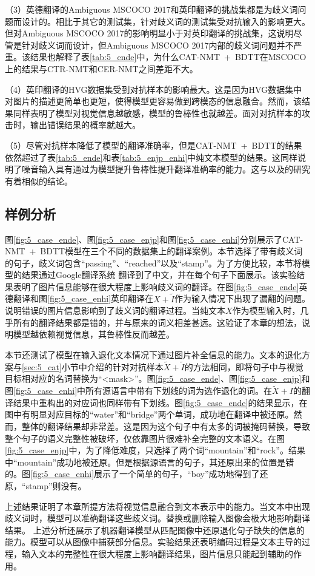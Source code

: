 （3）英德翻译的Ambiguous MSCOCO 2017和英印翻译的挑战集都是为歧义词问题而设计的。相比于其它的测试集，针对歧义词的测试集受对抗输入的影响更大。但对Ambiguous MSCOCO 2017的影响明显小于对英印翻译的挑战集，这说明尽管是针对歧义词而设计，但Ambiguous MSCOCO 2017内部的歧义词问题并不严重。该结果也解释了表\ref{tab:5_ende}中，为什么CAT-NMT~+~BDTT在MSCOCO上的结果与CTR-NMT和CER-NMT之间差距不大。

（4）英印翻译的HVG数据集受到对抗样本的影响最大。这是因为HVG数据集中对图片的描述更简单也更短，使得模型更容易做到跨模态的信息融合。然而，该结果同样表明了模型对视觉信息越敏感，模型的鲁棒性也就越差。面对对抗样本的攻击时，输出错误结果的概率就越大。

（5）尽管对抗样本降低了模型的翻译准确率，但是CAT-NMT~+~BDTT的结果依然超过了表\ref{tab:5_ende}和表\ref{tab:5_enjp_enhi}中纯文本模型的结果。这同样说明了噪音输入具有通过为模型提升鲁棒性提升翻译准确率的能力。这与以及的研究有着相似的结论。


\subsection{样例分析}
图\ref{fig:5_case_ende}、图\ref{fig:5_case_enjp}和图\ref{fig:5_case_enhi}分别展示了CAT-NMT~+~BDTT模型在三个不同的数据集上的翻译案例。本节选择了带有歧义词的句子，歧义词包含“passing”、“reached”以及“stamp”。为了方便比较，本节将模型的结果通过Google翻译系统%
翻译到了中文，并在每个句子下面展示。该实验结果表明了图片信息能够在很大程度上影响歧义词的翻译。在图\ref{fig:5_case_ende}英德翻译和图\ref{fig:5_case_enhi}英印翻译在$X+\tilde{I}$作为输入情况下出现了漏翻的问题。说明错误的图片信息影响到了歧义词的翻译过程。当纯文本$X$作为模型输入时，几乎所有的翻译结果都是错的，并与原来的词义相差甚远。这验证了本章的想法，说明模型越依赖视觉信息，其鲁棒性反而越差。




本节还测试了模型在输入退化文本情况下通过图片补全信息的能力。文本的退化方案与\ref{sec:5_cat}小节中介绍的针对对抗样本$\tilde{X}+\tilde{I}$的方法相同，即将句子中与视觉目标相对应的名词替换为“<mask>”。图\ref{fig:5_case_ende}、图\ref{fig:5_case_enjp}和图\ref{fig:5_case_enhi}中所有源语言中带有下划线的词为选作退化的词。在$\tilde{X}+I$的翻译结果中重构出的对应词也同样带有下划线。图\ref{fig:5_case_ende}的结果显示，在图中有明显对应目标的“water”和“bridge”两个单词，成功地在翻译中被还原。然而，整体的翻译结果却非常差。这是因为这个句子中有太多的词被掩码替换，导致整个句子的语义完整性被破坏，仅依靠图片很难补全完整的文本语义。在图\ref{fig:5_case_enjp}中，为了降低难度，只选择了两个词“mountain”和“rock”。结果中“mountain”成功地被还原。但是根据源语言的句子，其还原出来的位置是错的。图\ref{fig:5_case_enhi}展示了一个简单的句子，“boy”成功地得到了还原，“stamp”则没有。

上述结果证明了本章所提方法将视觉信息融合到文本表示中的能力。当文本中出现歧义词时，模型可以准确翻译这些歧义词。替换或删除输入图像会极大地影响翻译结果。
上述分析还展示了机器翻译模型从匹配图像中还原退化句子缺失的信息的能力。模型可以从图像中捕获部分信息。实验结果还表明编码过程是文本主导的过程，输入文本的完整性在很大程度上影响翻译结果，图片信息只能起到辅助的作用。